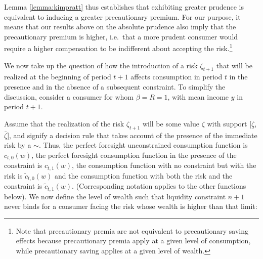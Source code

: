 \documentclass[titlepage]{\econtex}
\begin{document}
  \noindent Lemma \ref{lemma:kimpratt} thus establishes that exhibiting greater prudence is equivalent to inducing a greater precautionary premium. For our purpose, it means that our results above on the absolute prudence also imply that the precautionary premium is higher, i.e.\ that a more prudent consumer would require a higher compensation to be indifferent about accepting the risk.\footnote{Note that precautionary premia are not equivalent to precautionary saving effects because precautionary premia apply at a given level of consumption, while precautionary saving applies at a given level of wealth.}

  We now take up the question of how the introduction of a risk $\zeta_{t+1}$ that will be realized at the beginning of period $t+1$ affects consumption in period $t$ in the presence and in the absence of a subsequent constraint.  To simplify the discussion, consider a consumer for whom $\beta=R=1$, with mean income ${y}$ in period $t+1$.

  Assume that the realization of the risk $\zeta_{t+1}$ will be some value $\zeta$ with support [$\underline{\zeta}$,$\bar{\zeta}$], and signify a decision rule that takes account of the presence of the immediate risk by a $\sim$.  Thus, the perfect foresight unconstrained consumption function is $c_{t,0}(w)$, the perfect foresight consumption function in the presence of the constraint is $c_{t,1}(w)$, the consumption function with no constraint but with the risk is $\tilde{c}_{t,0}(w)$ and the consumption function with both the risk and the constraint is $\tilde{c}_{t,1}(w)$.  (Corresponding notation applies to the other functions below). We now define the level of wealth such that liquidity constraint $n+1$ never binds for a consumer facing the risk whose wealth is higher than that limit:
\end{document}
